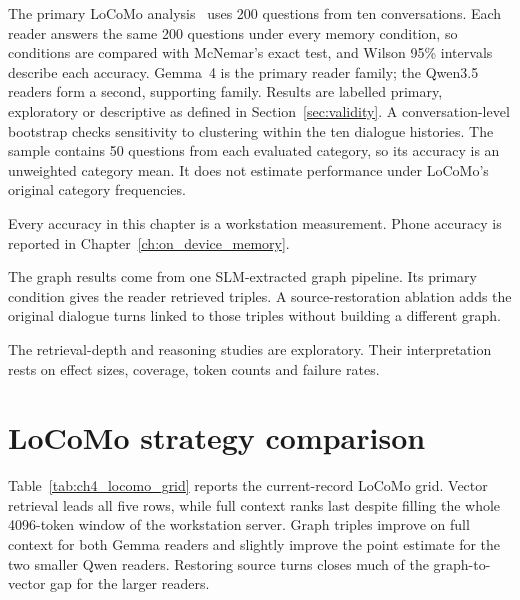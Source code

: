 The primary LoCoMo analysis~\citep{locomo} uses 200 questions from ten conversations. Each reader
answers the same 200 questions under every memory condition, so conditions are compared with
McNemar's exact test, and Wilson 95\% intervals describe each accuracy. Gemma~4 is the primary reader
family; the Qwen3.5 readers form a second, supporting family. Results are labelled primary,
exploratory or descriptive as defined in Section~\ref{sec:validity}. A conversation-level bootstrap
checks sensitivity to clustering within the ten dialogue histories. The sample contains 50 questions
from each evaluated category, so its accuracy is an unweighted category mean. It does not estimate
performance under LoCoMo's original category frequencies.

Every accuracy in this chapter is a workstation measurement. Phone accuracy is reported in
Chapter~\ref{ch:on_device_memory}.

The graph results come from one SLM-extracted graph pipeline. Its primary condition gives the reader
retrieved triples. A source-restoration ablation adds the original dialogue turns linked to those
triples without building a different graph.

The retrieval-depth and reasoning studies are exploratory. Their interpretation rests on effect
sizes, coverage, token counts and failure rates.

\section{LoCoMo strategy comparison}
\label{sec:ch4_locomo_strategies}

Table~\ref{tab:ch4_locomo_grid} reports the current-record LoCoMo grid. Vector retrieval leads all
five rows, while full context ranks last despite filling the whole 4096-token window of the
workstation server. Graph
triples improve on full context for both Gemma readers and slightly improve the point estimate for
the two smaller Qwen readers. Restoring source turns closes much of the graph-to-vector gap for the
larger readers.

